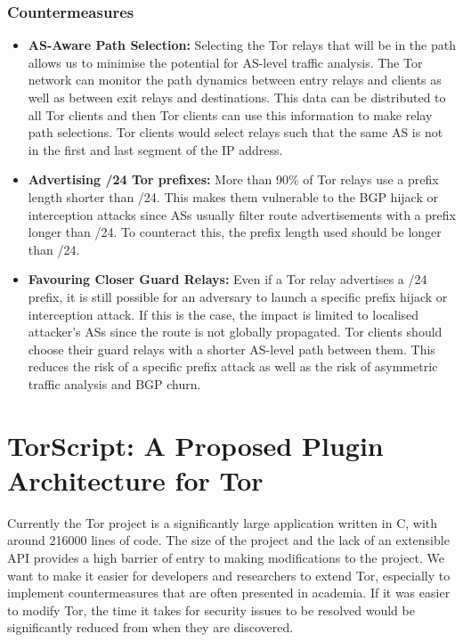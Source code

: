 \documentclass[9pt,technote]{IEEEtran}
\begin{document}
\subsubsection{Countermeasures}
\begin{itemize}
\item \textbf{AS-Aware Path Selection:} Selecting the Tor relays that will be in
	the path allows us to minimise the potential for AS-level traffic
	analysis. The Tor network can monitor the path dynamics between entry
	relays and clients as well as between exit relays and destinations. This
	data can be distributed to all Tor clients and then Tor clients can use
	this information to make relay path selections. Tor clients would select
	relays such that the same AS is not in the first and last segment of the IP
	address.
\item \textbf{Advertising /24 Tor prefixes:} More than 90\% of Tor relays use a
	prefix length shorter than /24. This makes them vulnerable to the BGP
	hijack or interception attacks since ASs usually filter route
	advertisements with a prefix longer than /24. To counteract this, the prefix length used should be longer than /24.
\item \textbf{Favouring Closer Guard Relays:} Even if a Tor relay advertises a
	/24 prefix, it is still possible for an adversary to launch a specific
	prefix hijack or interception attack. If this is the case, the impact is
	limited to localised attacker's ASs since the route is not globally
	propagated. Tor clients should choose their guard relays with a shorter
	AS-level path between them. This reduces the risk of a specific prefix
	attack as well as the risk of asymmetric traffic analysis and BGP churn.
\end{itemize}

\section{TorScript: A Proposed Plugin Architecture for Tor}
Currently the Tor project is a significantly large application written in C,
with around 216000 lines of code. The size of the project and the lack of an
extensible API provides a high barrier of entry to making modifications to the
project. We want to make it easier for developers and researchers to extend Tor, especially to implement countermeasures that are often presented in academia. If it was easier to modify Tor, the time it takes for security issues to be resolved would be significantly reduced from when they are discovered.\\
\end{document}
